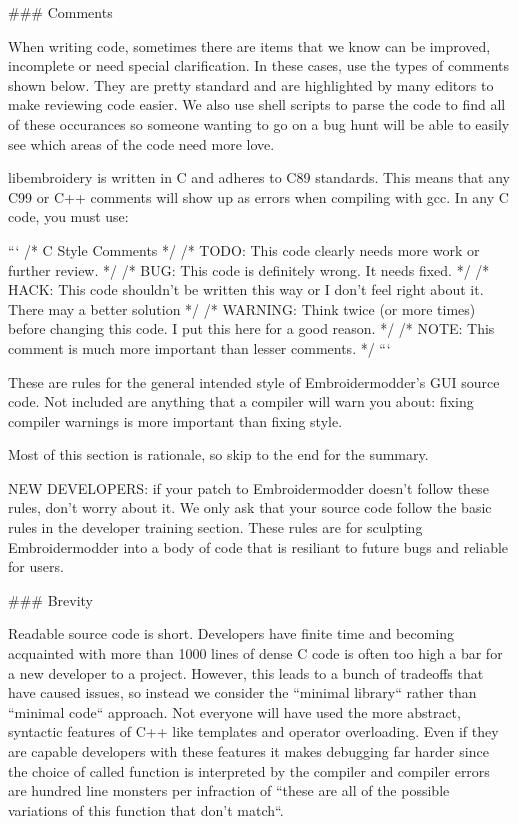 ### Comments

When writing code, sometimes there are items that we know can be improved,
incomplete or need special clarification. In these cases, use the types of
comments shown below. They are pretty standard and are highlighted by many editors to
make reviewing code easier. We also use shell scripts to parse the code to find
all of these occurances so someone wanting to go on a bug hunt will be able to
easily see which areas of the code need more love.

libembroidery is written in C and adheres to C89 standards. This means
that any C99 or C++ comments will show up as errors when compiling with
gcc. In any C code, you must use:

```
/* C Style Comments */
/* TODO: This code clearly needs more work or further review. */
/* BUG: This code is definitely wrong. It needs fixed. */
/* HACK: This code shouldn't be written this way or I don't feel right about it. There may a better solution */
/* WARNING: Think twice (or more times) before changing this code. I put this here for a good reason. */
/* NOTE: This comment is much more important than lesser comments. */
```

These are rules for the general intended style of Embroidermodder's GUI source
code. Not included are anything that a compiler will warn you about: fixing
compiler warnings is more important than fixing style.

Most of this section is rationale, so skip to the end for the summary.

NEW DEVELOPERS: if your patch to Embroidermodder doesn't follow these rules,
don't worry about it. We only ask that your source code follow the basic rules
in the developer training section. These rules are for sculpting Embroidermodder
into a body of code that is resiliant to future bugs and reliable for users.

### Brevity

Readable source code is short. Developers have finite time and becoming
acquainted with more than 1000 lines of dense C code is often too high a bar
for a new developer to a project. However, this leads to a bunch of tradeoffs
that have caused issues, so instead we consider the ``minimal library``
rather than ``minimal code`` approach. Not everyone will have used the more
abstract, syntactic features of C++ like templates and operator overloading.
Even if they are capable developers with these features it makes debugging far
harder since the choice of called function is interpreted by the compiler and compiler
errors are hundred line monsters per infraction of ``these are all of the possible
variations of this function that don't match``.


